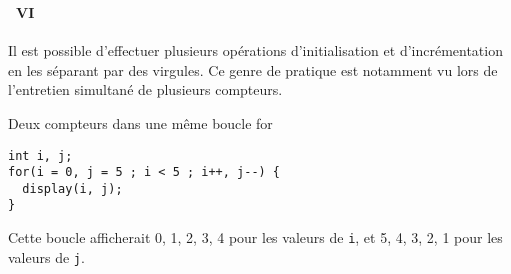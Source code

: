 \begin{frame}[containsverbatim]
  \frametitle{\secname}
  \framesubtitle{\subsecname~VI}

  Il est possible d'effectuer plusieurs opérations d'initialisation et d'incrémentation en les séparant par des virgules. Ce genre de pratique est notamment vu lors
  de l'entretien simultané de plusieurs compteurs.
  \vspace{0.5cm}
  \begin{exampleblock}{Deux compteurs dans une même boucle for}
    \begin{verbatim}
int i, j;
for(i = 0, j = 5 ; i < 5 ; i++, j--) {
  display(i, j);
}\end{verbatim}
  \end{exampleblock}
  \vspace{0.5cm}
  \par
  Cette boucle afficherait 0, 1, 2, 3, 4 pour les valeurs de \verb|i|, et 5, 4, 3, 2, 1 pour les valeurs de \verb|j|.
\end{frame}


